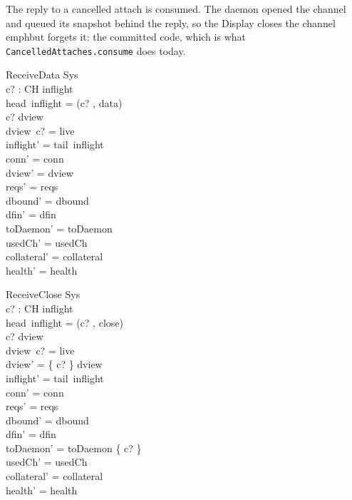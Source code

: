\documentclass[a4paper,10pt,fleqn]{article}
\begin{document}
The reply to a cancelled attach is consumed.  The daemon opened the channel
and queued its snapshot behind the reply, so the Display closes the channel
\\emph{but forgets it}: the committed code, which is what
\texttt{CancelledAttaches.consume} does today.

\begin{schema}{ReceiveData}
  \Delta Sys \\
  c? : CH
\where
  inflight \neq \langle \rangle \\
  head~inflight = (c? , data) \\
  c? \in \dom dview \\
  dview~c? = live \\
  inflight' = tail~inflight \\
  conn' = conn \\
  dview' = dview \\
  reqs' = reqs \\
  dbound' = dbound \\
  dfin' = dfin \\
  toDaemon' = toDaemon \\
  usedCh' = usedCh \\
  collateral' = collateral \\
  health' = health
\end{schema}

\begin{schema}{ReceiveClose}
  \Delta Sys \\
  c? : CH
\where
  inflight \neq \langle \rangle \\
  head~inflight = (c? , close) \\
  c? \in \dom dview \\
  dview~c? = live \\
  dview' = \{ c? \} \ndres dview \\
  inflight' = tail~inflight \\
  conn' = conn \\
  reqs' = reqs \\
  dbound' = dbound \\
  dfin' = dfin \\
  toDaemon' = toDaemon \cup \{ c? \} \\
  usedCh' = usedCh \\
  collateral' = collateral \\
  health' = health
\end{schema}
\end{document}
